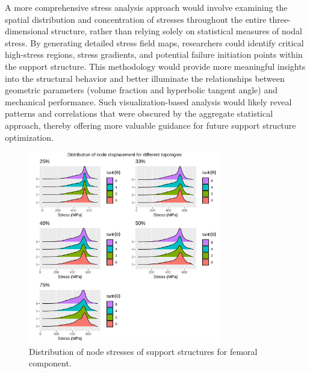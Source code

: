\documentclass[../main.tex]{subfiles}
\begin{document}
A more comprehensive stress analysis approach would involve examining the spatial distribution and concentration of stresses throughout the entire three-dimensional structure, rather than relying solely on statistical measures of nodal stress. By generating detailed stress field maps, researchers could identify critical high-stress regions, stress gradients, and potential failure initiation points within the support structure. This methodology would provide more meaningful insights into the structural behavior and better illuminate the relationships between geometric parameters (volume fraction and hyperbolic tangent angle) and mechanical performance. Such visualization-based analysis would likely reveal patterns and correlations that were obscured by the aggregate statistical approach, thereby offering more valuable guidance for future support structure optimization.


\begin{figure}[h!]
  \centering
  \includegraphics[width=0.75\textwidth]{images/results/plots/femoral/stress/stress_density_ridges.png}
  \caption{Distribution of node stresses of support structures for femoral component.}
\end{figure}
\end{document}
